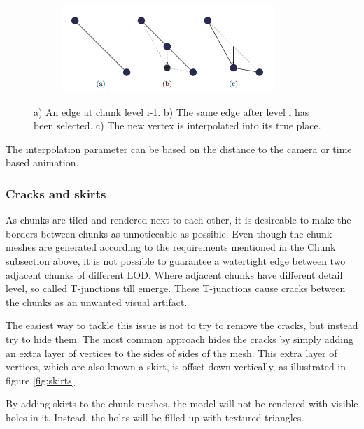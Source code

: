 \begin{figure}[htbp]
    \centering
    \begin{subfigure}[bt]{0.7\textwidth}
        \includegraphics[width=\textwidth]{figures/chunkedlod/switching.png}
    \end{subfigure}
    \caption{a) An edge at chunk level i-1. b) The same edge after level i has been selected. c) The new vertex is interpolated into its true place.}
    \label{fig:lodswitch}
\end{figure}

The interpolation parameter can be based on the distance to the camera or time based animation.

\subsubsection{Cracks and skirts}
\label{section:cracksandskirts}
As chunks are tiled and rendered next to each other, it is desireable to make the borders between chunks as unnoticeable as possible. Even though the chunk meshes are generated according to the requirements mentioned in the Chunk subsection above, it is not possible to guarantee a watertight edge between two adjacent chunks of different LOD. Where adjacent chunks have different detail level, so called T-junctions till emerge. These T-junctions cause cracks between the chunks as an unwanted visual artifact.

The easiest way to tackle this issue is not to try to remove the cracks, but instead try to hide them. The most common approach hides the cracks by simply adding an extra layer of vertices to the sides of sides of the mesh. This extra layer of vertices, which are also known a skirt, is offset down vertically, as illustrated in figure \ref{fig:skirts}. 

By adding skirts to the chunk meshes, the model will not be rendered with visible holes in it. Instead, the holes will be filled up with textured triangles.


